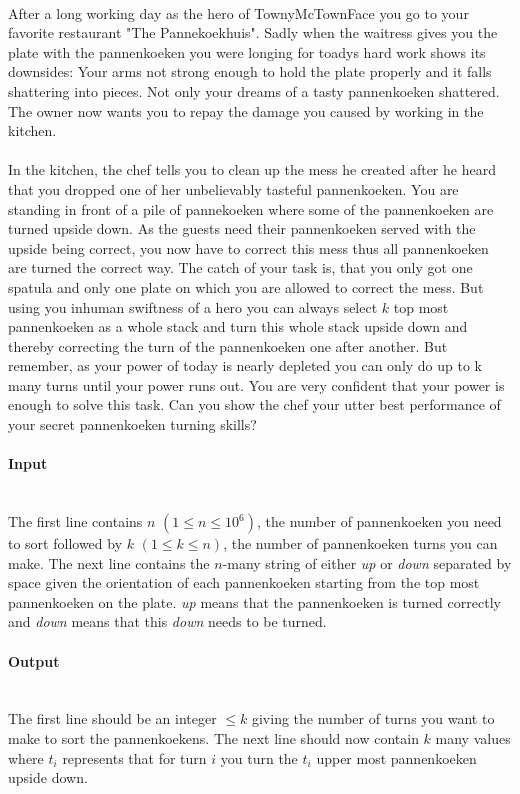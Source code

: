 



\makeheader \ \\
After a long working day as the hero of TownyMcTownFace you go to your favorite restaurant "The Pannekoekhuis". Sadly when the waitress gives you the plate with the pannenkoeken you were longing for toadys hard work shows its downsides: Your arms not strong enough to hold the plate properly and it falls shattering into pieces. Not only your dreams of a tasty pannenkoeken shattered. The owner now wants you to repay the damage you caused by working in the kitchen. \\ \ \\
In the kitchen, the chef tells you to clean up the mess he created after he heard that you dropped one of her unbelievably tasteful pannenkoeken. You are standing in front of a pile of pannekoeken where some of the pannenkoeken are turned upside down. As the guests need their pannenkoeken served with the upside being correct, you now have to correct this mess thus all pannenkoeken are turned the correct way. The catch of your task is, that you only got one spatula and only one plate on which you are allowed to correct the mess. But using you inhuman swiftness of a hero you can always select $k$ top most pannenkoeken as a whole stack and turn this whole stack upside down and thereby correcting the turn of the pannenkoeken one after another. But remember, as your power of today is nearly depleted you can only do up to k many turns until your power runs out. You are very confident that your power is enough to solve this task. Can you show the chef your utter best performance of your secret pannenkoeken turning skills?


\paragraph*{Input}\ \\
The first line contains $n$ $(1 \leq n \leq  10^6)$, the number of pannenkoeken you need to sort followed by $k$ $(1 \leq k \leq  n)$, the number of pannenkoeken turns you can make. The next line contains the $n$-many string of either \emph{up} or \emph{down} separated by space given the orientation of each pannenkoeken starting from the top most pannenkoeken on the plate. \emph{up} means that the pannenkoeken is turned correctly and \emph{down} means that this \emph{down} needs to be turned.

\paragraph*{Output}\ \\
The first line should be an integer $\leq k$ giving the number of turns you want to make to sort the pannenkoekens. The next line should now contain $k$ many values where $t_i$ represents that for turn $i$ you turn the $t_i$ upper most pannenkoeken upside down.
\begin{samples}
\end{samples}


